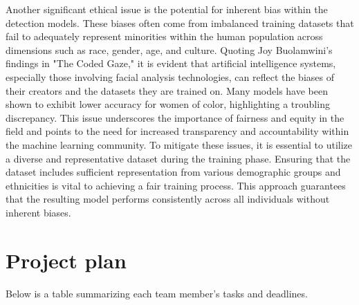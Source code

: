 \documentclass{article} %
\begin{document}
Another significant ethical issue is the potential for inherent bias within the detection models. These biases often come from imbalanced training datasets that fail to adequately represent minorities within the human population across dimensions such as race, gender, age, and culture. Quoting Joy Buolamwini’s findings in "The Coded Gaze," it is evident that artificial intelligence systems, especially those involving facial analysis technologies, can reflect the biases of their creators and the datasets they are trained on. Many models have been shown to exhibit lower accuracy for women of color, highlighting a troubling discrepancy. This issue underscores the importance of fairness and equity in the field and points to the need for increased transparency and accountability within the machine learning community. To mitigate these issues, it is essential to utilize a diverse and representative dataset during the training phase. Ensuring that the dataset includes sufficient representation from various demographic groups and ethnicities is vital to achieving a fair training process. This approach guarantees that the resulting model performs consistently across all individuals without inherent biases.


\section{Project plan }
Below is a table summarizing each team member’s tasks and deadlines.
\end{document}
